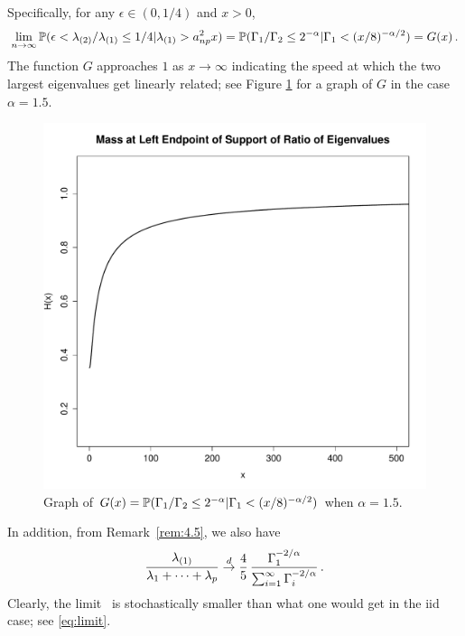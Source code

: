 \begin{example}
Specifically, for any $\epsilon\in (0,1/4)$ and $x>0$,
\begin{equation*}
\lim_{n\to\infty} \P(\epsilon<\lambda_{(2)}/\lambda_{(1)}\le 1/4|\lambda_{(1)}>a_{np}^2x)
=\P(\Gamma_1/\Gamma_2\le 2^{-\alpha}|\Gamma_1<(x/8)^{-\alpha/2})=G(x)\,.
\end{equation*}
The function $G$ approaches $1$ as $x\to\infty$ indicating the speed at which the
two largest eigenvalues get linearly related; see Figure \ref{fig:2} for a graph of $G$ in the case $\alpha=1.5$.
\begin{figure} [h]
\begin{center}
\includegraphics[scale=.35]{Hfunction.pdf}
\end{center}
\caption{Graph of $G(x)=\P(\Gamma_1/\Gamma_2\le2^{-\alpha}|\Gamma_1<(x/8)^{-\alpha/2})$ when $\alpha=1.5$.}
\label{fig:2}
\end{figure}
In addition, from Remark~\ref{rem:4.5}, we also have
\begin{equation*}
\dfrac{\la_{(1)}}{\la_1+\cdots +\la_p} \cid \dfrac{4}{5}\,
\dfrac{\Gamma_1^{-2/\alpha}}{\sum_{i=1}^\infty \Gamma_i^{-2/\alpha}}\,.
\end{equation*}
Clearly, the limit \rv\ is stochastically smaller than what one would get in the iid case; see \eqref{eq:limit}.
\end{example}
